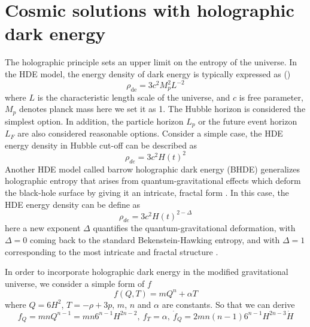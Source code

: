 \documentclass[a4paper,fleqn]{cas-sc}
\begin{document}
\section{Cosmic solutions with holographic dark energy}\label{sec:solution}

The holographic principle sets an upper limit on the entropy of the universe.  In the HDE model, the energy density of dark energy is typically expressed as (\cite{LI20041})
\begin{equation}
    \rho_\text{de} = 3c^2 M_p^2 L^{-2}
\end{equation}
where $L$ is the characteristic length scale of the universe, and $c$ is free parameter, $M_p$ denotes planck mass here we set it as 1. The Hubble horizon is considered the simplest option.  In addition, the particle horizon $L_p$ or the future event horizon $L_F$ are also considered reasonable options. Consider a simple case, the HDE energy density in Hubble cut-off can be described as 
\begin{equation}
    \rho_{de}=3c^2 H(t)^2 \label{HDE}
\end{equation}
Another HDE model called barrow holographic dark energy (BHDE) generalizes holographic entropy that arises from quantum-gravitational effects which deform the black-hole surface by giving it an intricate, fractal form . In this case, the HDE energy density can be define as
\begin{equation}
    \rho_{de}=3c^2 H(t)^{2-\Delta}\label{BHDEdef}
\end{equation}
here a new exponent $\Delta$ quantifies the quantum-gravitational deformation, with $\Delta=0$ coming back to the standard Bekenstein-Hawking entropy, and with $\Delta=1$ corresponding to the most intricate and fractal structure \cite{PhysRevD.102.123525}.

In order to incorporate holographic dark energy in the modified gravitational universe, we consider a simple form of $f$ 
\begin{equation}
    f(Q,T)=m Q^n+\alpha T
\end{equation}
where $Q=6H^2$, $T=-\rho+3p$, $m$, $n$ and $\alpha$ are constants. So that we can derive 
\begin{equation}
    f_Q= mn Q^{n-1}=mn 6^{n-1}H^{2n-2},\  f_T=\alpha,\ \dot{f}_Q=2 mn(n-1)6^{n-1}H^{2n-3}\dot{H}
\end{equation}
\end{document}
